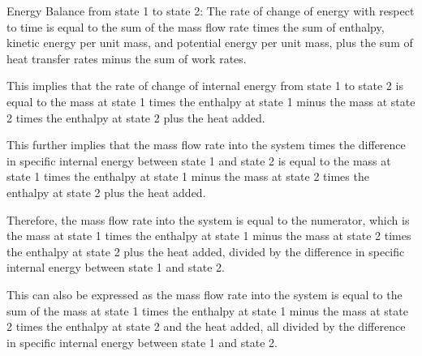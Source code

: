 Energy Balance from state 1 to state 2:
The rate of change of energy with respect to time is equal to the sum of the mass flow rate times the sum of enthalpy, kinetic energy per unit mass, and potential energy per unit mass, plus the sum of heat transfer rates minus the sum of work rates.

This implies that the rate of change of internal energy from state 1 to state 2 is equal to the mass at state 1 times the enthalpy at state 1 minus the mass at state 2 times the enthalpy at state 2 plus the heat added.

This further implies that the mass flow rate into the system times the difference in specific internal energy between state 1 and state 2 is equal to the mass at state 1 times the enthalpy at state 1 minus the mass at state 2 times the enthalpy at state 2 plus the heat added.

Therefore, the mass flow rate into the system is equal to the numerator, which is the mass at state 1 times the enthalpy at state 1 minus the mass at state 2 times the enthalpy at state 2 plus the heat added, divided by the difference in specific internal energy between state 1 and state 2.

This can also be expressed as the mass flow rate into the system is equal to the sum of the mass at state 1 times the enthalpy at state 1 minus the mass at state 2 times the enthalpy at state 2 and the heat added, all divided by the difference in specific internal energy between state 1 and state 2.